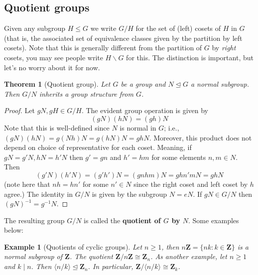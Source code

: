 \documentclass[12pt]{article}
\numberwithin{equation}{subsection}
\newtheorem{thm}[subsection]{Theorem}
\theoremstyle{note}
\newtheorem{example}[subsection]{Example}
\newcommand{\nrml}{\trianglelefteq}
\begin{document}
\subsection{Quotient groups} 
Given any subgroup $H\leq G$ we write $G/H$ for the set of (left) cosets of $H$ in $G$ (that is, the associated set of equivalence classes given by the partition by left cosets). Note that this is generally different from the partition of $G$ by \textit{right} cosets, you may see people write $H\backslash G$ for this. The distinction is important, but let's no worry about it for now.


\begin{thm}[Quotient group]
	Let $G$ be a group and $N\nrml G$ a normal subgroup. Then $G/N$ inherits a group structure from $G$. 
\end{thm}


\begin{proof}
Let $gN,gH\in G/H$. The evident group operation is given by \[ (gN)(hN)=(gh)N\] Note that this is well-defined since $N$ is normal in $G$; i.e., $(gN)(hN)=g(Nh)N=g(hN)N=ghN$. Moreover, this product does not depend on choice of representative for each coset. Meaning, if $gN=g'N, hN=h'N$ then $g'=gn$ and $h'=hm$ for some elements $n,m\in N$. Then \[(g'N)(h'N)=(g'h')N=(gnhm)N=ghn'mN=ghN\] (note here that $nh=hn'$ for some $n'\in N$ since the right coset and left coset by $h$ agree.) The identity in $G/N$ is given by the subgroup $N=eN$. If $gN\in G/N$ then $(gN)^{-1}=g^{-1}N$. 
\end{proof}

The resulting group $G/N$ is called the \textbf{quotient of $G$ by $N$}. Some examples below:

\begin{example}[Quotients of cyclic groups]
	 Let $n\geq1$, then $n\mathbf{Z}=\{nk:k\in \mathbf{Z}\}$ is a normal subgroup of $\mathbf{Z}$. The quotient $\mathbf{Z}/n\mathbf{Z}\cong \mathbf{Z}_n$.
	As another example, let $n\geq 1$ and $k\mid n$. Then $\langle n/k\rangle\nrml \mathbf{Z}_n$. In particular, $\mathbf{Z}/\langle n/k\rangle \cong \mathbf{Z}_k$.
\end{example}
\end{document}

